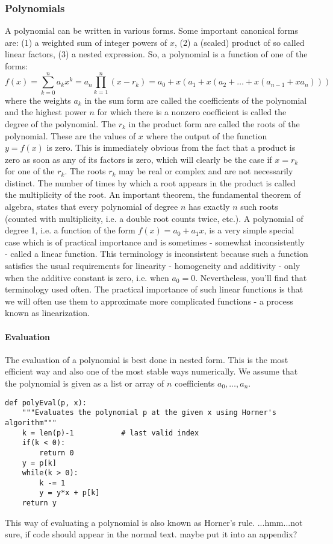 
\subsubsection{Polynomials}
A polynomial can be written in various forms. Some important canonical forms are: (1) a weighted sum of integer powers of $x$, (2) a (scaled) product of so called linear factors, (3) a nested expression. So, a polynomial is a function of one of the forms:
\begin{equation}
 f(x) = \sum_{k=0}^n a_k x^k 
      = a_n \prod_{k=1}^{n} (x - r_k)
      = a_0 + x(a_1 + x(a_2 + \ldots + x(a_{n-1} + x a_n)))
\end{equation}
where the weights $a_k$ in the sum form are called the coefficients of the polynomial and the highest power $n$ for which there is a nonzero coefficient is called the degree of the polynomial. The $r_k$ in the product form are called the roots of the polynomial. These are the values of $x$ where the output of the function $y = f(x)$ is zero. This is immediately obvious from the fact that a product is zero as soon as any of its factors is zero, which will clearly be the case if $x = r_k$ for one of the $r_k$. The roots $r_k$ may be real or complex and are not necessarily distinct. The number of times by which a root appears in the product is called the multiplicity of the root. An important theorem, the fundamental theorem of algebra, states that every polynomial of degree $n$ has exactly $n$ such roots (counted with multiplicity, i.e. a double root counts twice, etc.). A polynomial of degree 1, i.e. a function of the form $f(x) = a_0 + a_1  x$, is a very simple special case which is of practical importance and is sometimes - somewhat inconsistently - called a linear function. This terminology is inconsistent because such a function satisfies the usual requirements for linearity - homogeneity and additivity - only when the additive constant is zero, i.e. when $a_0 = 0$. Nevertheless, you'll find that terminology used often. The practical importance of such linear functions is that we will often use them to approximate more complicated functions - a process known as linearization. 

\paragraph{Evaluation}
The evaluation of a polynomial is best done in nested form. This is the most efficient way and also one of the most stable ways numerically. We assume that the polynomial is given as a list or array of $n$ coefficients $a_0, \ldots, a_n$.
\begin{lstlisting}
def polyEval(p, x):
	"""Evaluates the polynomial p at the given x using Horner's algorithm"""
	k = len(p)-1           # last valid index
	if(k < 0):
		return 0
	y = p[k]
	while(k > 0):
		k -= 1
		y = y*x + p[k]
	return y
\end{lstlisting}
This way of evaluating a polynomial is also known as Horner's rule.
...hmm...not sure, if code should appear in the normal text. maybe put it into an appendix?

